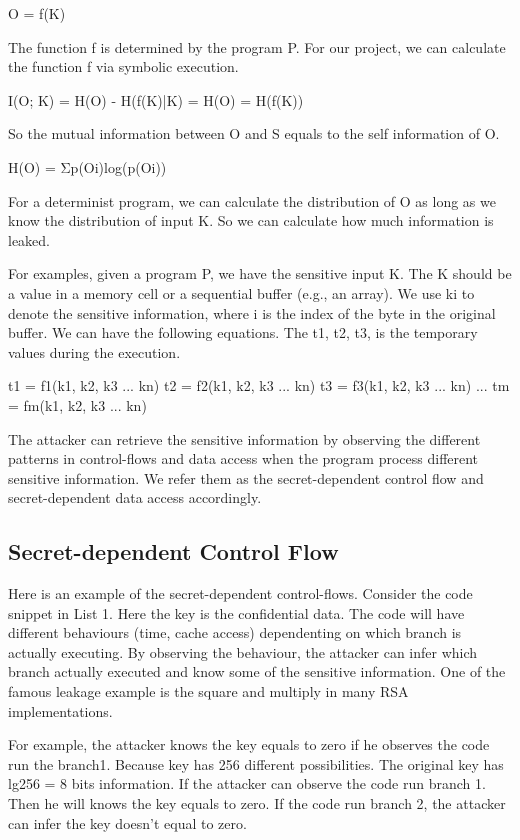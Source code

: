 O = f(K)

The function f is determined by the program P. For our project, we can calculate the function f via symbolic execution.

I(O; K) = H(O) - H(f(K)|K) = H(O) = H(f(K))

So the mutual information between O and S equals to the self information of O. 

H(O) = Σp(Oi)log(p(Oi))

For a determinist program, we can calculate the distribution of O as long as we know the distribution of input K. So we can calculate how much information is leaked.

For examples, given a program P, we have the sensitive input K. The K should be a value in a memory cell or a sequential buffer (e.g., an array). We use ki to denote the sensitive information, where i is the index of the byte in the original buffer.  We can have the following equations. The t1, t2, t3, is the temporary values during the execution.

t1 = f1(k1, k2, k3 ... kn)
t2 = f2(k1, k2, k3 ... kn)
t3 = f3(k1, k2, k3 ... kn)
...
tm = fm(k1, k2, k3 ... kn)

The attacker can retrieve the sensitive information by observing the different patterns in control-flows and data access when the program process different sensitive information. We refer them as the secret-dependent control flow and secret-dependent data access accordingly.

\subsection{Secret-dependent Control Flow}
Here is an example of the secret-dependent control-flows. Consider the code snippet in List 1. Here the key is the confidential data. The code will have different behaviours (time, cache access) dependenting on which branch is actually executing. By observing the behaviour, the attacker can infer which branch actually executed and know some of the sensitive information. One of the famous leakage example is the square and multiply in many RSA implementations. 

For example, the attacker knows the key equals to zero if he observes the code run the branch1. Because key has 256 different possibilities. The original key has lg256 = 8 bits information. If the attacker can observe the code run branch 1. Then he will knows the key equals to zero. If the code run branch 2, the attacker can infer the key doesn’t equal to zero. 

